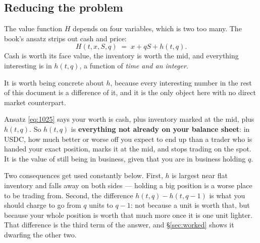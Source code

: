\documentclass[11pt,a4paper]{article}
\begin{document}
\subsection{Reducing the problem}

The value function $H$ depends on four variables, which is two too many. The
book's ansatz strips out cash and price:
\begin{equation}
  H(t,x,S,q) \;=\; x + qS + h(t,q).
  \tag{10.25}
  \label{eq:1025}
\end{equation}
Cash is worth its face value, the inventory is worth the mid, and everything
interesting is in $h(t,q)$, a function of \emph{time and an integer}.

\begin{intuition}
It is worth being concrete about $h$, because every interesting number in the
rest of this document is a difference of it, and it is the only object here with
no direct market counterpart.

Ansatz \eqref{eq:1025} says your worth is cash, plus inventory marked at the mid,
plus $h(t,q)$. So $h(t,q)$ is \textbf{everything not already on your balance
sheet}: in USDC, how much better or worse off you expect to end up than a trader
who is handed your exact position, marks it at the mid, and stops trading on the
spot. It is the value of still being in business, given that you are in business
holding $q$.

Two consequences get used constantly below. First, $h$ is largest near flat
inventory and falls away on both sides --- holding a big position is a worse place
to be trading from. Second, the difference $h(t,q) - h(t,q-1)$ is what you should
charge to go from $q$ units to $q-1$: not because a unit is worth that, but
because your whole position is worth that much more once it is one unit lighter.
That difference is the third term of the answer, and \S\ref{sec:worked} shows it
dwarfing the other two.
\end{intuition}
\end{document}
